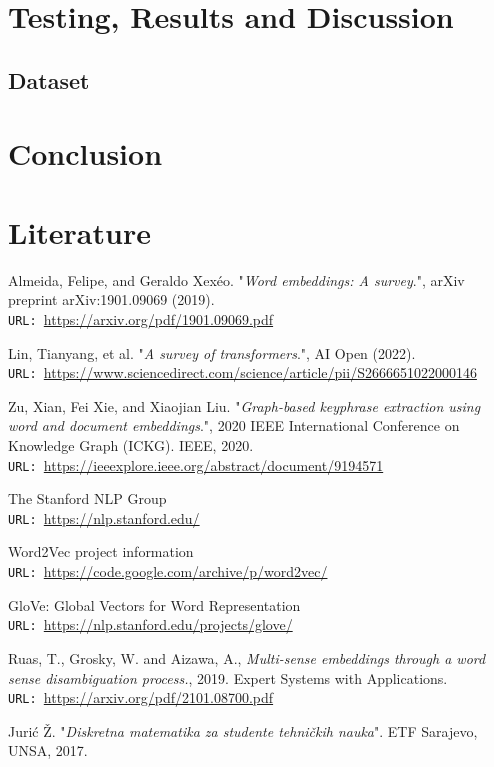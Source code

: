 \documentclass[12pt]{article}
\numberwithin{equation}{section}
\begin{document}
\begin{spacing}{1.5}
	\section{Testing, Results and Discussion}
	
	\subsection{Dataset}
	
	\section{Conclusion}
	
	\newpage
	\section{Literature}
	
	\begin{thebibliography}{8}
		Almeida, Felipe, and Geraldo Xexéo. "\textit{Word embeddings: A survey}.", arXiv preprint arXiv:1901.09069 (2019). \\
		\texttt{URL: }\url{https://arxiv.org/pdf/1901.09069.pdf}
		
		Lin, Tianyang, et al. "\textit{A survey of transformers}.", AI Open (2022).\\
		\texttt{URL: }\url{https://www.sciencedirect.com/science/article/pii/S2666651022000146}
		
		Zu, Xian, Fei Xie, and Xiaojian Liu. "\textit{Graph-based keyphrase extraction using word and document embeddings}.", 2020 IEEE International Conference on Knowledge Graph (ICKG). IEEE, 2020. \\
		\texttt{URL: }\url{https://ieeexplore.ieee.org/abstract/document/9194571}
		
		The Stanford NLP Group\\
		\texttt{URL: }\url{https://nlp.stanford.edu/}
		
		Word2Vec project information\\
		\texttt{URL: }\url{https://code.google.com/archive/p/word2vec/}
		
		GloVe: Global Vectors for Word Representation\\
		\texttt{URL: }\url{https://nlp.stanford.edu/projects/glove/}
		
		Ruas, T., Grosky, W. and Aizawa, A.,  \textit{Multi-sense embeddings through a word sense disambiguation process.}, 2019. Expert Systems with Applications. \\
		\texttt{URL: }\url{https://arxiv.org/pdf/2101.08700.pdf}
		
		Jurić Ž. "\textit{Diskretna matematika za studente tehničkih nauka}". ETF Sarajevo, UNSA, 2017. 
		
	\end{thebibliography}

	\end{spacing}
	
\end{document}
